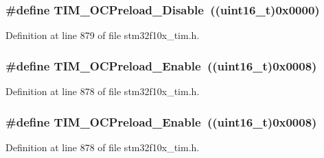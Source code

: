 \subsubsection[{\texorpdfstring{T\+I\+M\+\_\+\+O\+C\+Preload\+\_\+\+Disable}{TIM_OCPreload_Disable}}]{\setlength{\rightskip}{0pt plus 5cm}\#define T\+I\+M\+\_\+\+O\+C\+Preload\+\_\+\+Disable~(({\bf uint16\+\_\+t})0x0000)}\hypertarget{group___t_i_m___output___compare___preload___state_ga0cbcc3c4d90d61d85550db2173737ed6}{}\label{group___t_i_m___output___compare___preload___state_ga0cbcc3c4d90d61d85550db2173737ed6}


Definition at line 879 of file stm32f10x\+\_\+tim.\+h.

\subsubsection[{\texorpdfstring{T\+I\+M\+\_\+\+O\+C\+Preload\+\_\+\+Enable}{TIM_OCPreload_Enable}}]{\setlength{\rightskip}{0pt plus 5cm}\#define T\+I\+M\+\_\+\+O\+C\+Preload\+\_\+\+Enable~(({\bf uint16\+\_\+t})0x0008)}\hypertarget{group___t_i_m___output___compare___preload___state_gad647db2e7a89bd6db3c787680afccf8f}{}\label{group___t_i_m___output___compare___preload___state_gad647db2e7a89bd6db3c787680afccf8f}


Definition at line 878 of file stm32f10x\+\_\+tim.\+h.

\subsubsection[{\texorpdfstring{T\+I\+M\+\_\+\+O\+C\+Preload\+\_\+\+Enable}{TIM_OCPreload_Enable}}]{\setlength{\rightskip}{0pt plus 5cm}\#define T\+I\+M\+\_\+\+O\+C\+Preload\+\_\+\+Enable~(({\bf uint16\+\_\+t})0x0008)}\hypertarget{group___t_i_m___output___compare___preload___state_gad647db2e7a89bd6db3c787680afccf8f}{}\label{group___t_i_m___output___compare___preload___state_gad647db2e7a89bd6db3c787680afccf8f}


Definition at line 878 of file stm32f10x\+\_\+tim.\+h.

